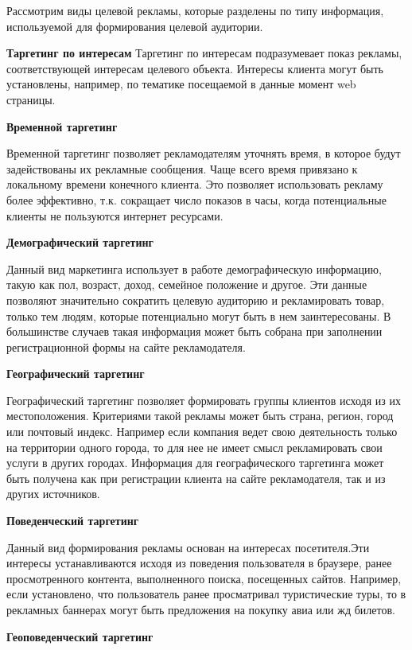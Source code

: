 Рассмотрим виды целевой рекламы, которые разделены по типу информация, используемой для формирования целевой аудитории.

\textbf{Таргетинг по интересам}
Таргетинг по интересам подразумевает показ рекламы, соответствующей интересам целевого объекта. Интересы клиента могут быть установлены, например, по тематике посещаемой в данные момент web страницы.

\textbf{Временной таргетинг}

Временной таргетинг позволяет рекламодателям уточнять время, в которое будут задействованы их рекламные сообщения. Чаще всего время привязано к локальному времени конечного клиента. Это позволяет использовать рекламу более эффективно, т.к. сокращает число показов в часы, когда потенциальные клиенты не пользуются интернет ресурсами. \cite{timeTargeting1}
    
\textbf{Демографический таргетинг}

Данный вид маркетинга использует в работе демографическую информацию, такую как пол, возраст, доход, семейное положение и другое. Эти данные позволяют значительно сократить целевую аудиторию и рекламировать товар, только тем людям, которые потенциально могут быть в нем заинтересованы. В большинстве случаев такая информация может быть собрана при заполнении регистрационной формы на сайте рекламодателя.

\textbf{Географический таргетинг}

Географический таргетинг позволяет формировать группы клиентов исходя из их местоположения. Критериями такой рекламы может быть страна,  регион, город или почтовый индекс. Например если компания ведет свою деятельность только на территории одного города, то для нее не имеет смысл рекламировать свои услуги в других городах. Информация для географического таргетинга может быть получена как при регистрации клиента на сайте рекламодателя, так и из других источников.\cite{kindOfTarget1}

\textbf{Поведенческий таргетинг}

Данный вид формирования рекламы основан на интересах посетителя.Эти интересы устанавливаются исходя из поведения пользователя в браузере, ранее просмотренного контента, выполненного поиска, посещенных сайтов. Например, если установлено, что пользователь ранее просматривал туристические туры, то в рекламных баннерах могут быть предложения на покупку авиа или жд билетов. 
        
\textbf{Геоповеденческий таргетинг}

